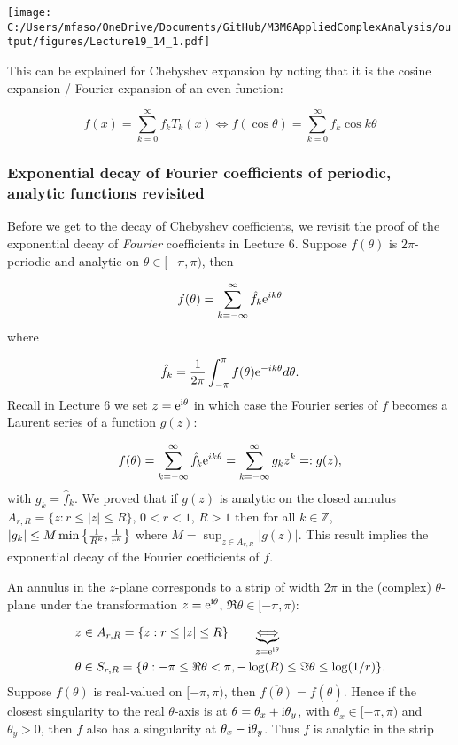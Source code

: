 \documentclass[12pt,a4paper]{article}
\def\I{ {\rm i} }
\def\E{ {\rm e} }
\begin{document}
\texttt{[image: C:/Users/mfaso/OneDrive/Documents/GitHub/M3M6AppliedComplexAnalysis/output/figures/Lecture19\_14\_1.pdf]}

This can be explained for Chebyshev expansion by noting that it is the cosine expansion / Fourier expansion of an even function:

\[
f(x) = \sum_{k=0}^\infty f_k T_k(x) \Leftrightarrow f(\cos \theta) = \sum_{k=0}^\infty f_k \cos k \theta
\]
\subsubsection{Exponential decay of Fourier coefficients of periodic, analytic functions revisited}
Before we get to the decay of Chebyshev coefficients, we revisit the proof of the exponential decay of \emph{Fourier} coefficients in Lecture 6. Suppose $f(\theta)$ is $2\pi$-periodic and analytic on $\theta \in [-\pi, \pi)$, then

\[
    f(\theta) = \sum_{k=-\infty}^\infty \hat f_k \E^{i k \theta}
\]
where

\[
\hat f_k = {1\over 2 \pi} \int_{-\pi}^\pi f(\theta) \E^{-i k \theta} d \theta.
\]
Recall in Lecture 6 we set $z = \E^{\I \theta}$ in which case the Fourier series of $f$ becomes a Laurent series of a function $g(z)$:

\[
f(\theta) = \sum_{k=-\infty}^\infty \hat f_k \E^{i k \theta} = \sum_{k=-\infty}^\infty g_k z^k =: g(z),
\]
with $g_k = \hat f_k$. We proved that if $g(z)$ is analytic on the closed annulus $A_{r,R} = \lbrace z : r \leq \vert z \vert \leq R \rbrace$, $0 < r <1$, $R > 1$ then for all $k \in \mathbb{Z}$, $|g_k | \leq M\min\left\{{1 \over R^k} , {1 \over r^k}\right\}$ where $M = \sup_{z \in  A_{r,R}} |g(z)|$. This result implies the exponential decay of the Fourier coefficients of $f$.

An annulus in the $z$-plane corresponds to a strip of width $2\pi$ in the (complex) $\theta$-plane under the transformation $z = \E^{\I \theta}$, $\Re \theta \in [-\pi, \pi)$:


\begin{align*}
& z \in A_{r,R} = \lbrace z : r \leq \vert z \vert \leq R \rbrace \qquad \underbrace{\Longleftrightarrow}_{z = \E^{\I \theta}} \\
& \theta \in  S_{r,R} =   \lbrace \theta : -\pi \leq \Re  \theta < \pi,  -\log(R) \leq \Im \theta \leq \log(1/r) \rbrace.
\end{align*}
Suppose $f(\theta)$ is real-valued on $[-\pi, \pi)$, then $\overline{f(\theta)} = f(\overline{\theta})$. Hence if the closest singularity to the real $\theta$-axis is at $\theta = \theta_x + \I \theta_y$, with $\theta_x \in [-\pi, \pi)$ and $\theta_y > 0$, then $f$ also has a singularity at  $\theta_x - \I \theta_y$. Thus $f$ is analytic in the strip
\end{document}
